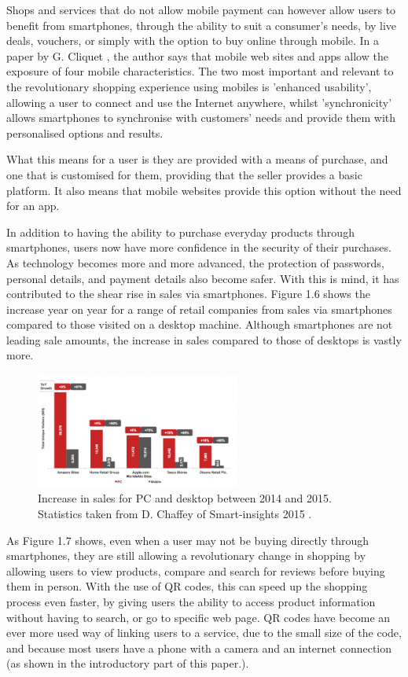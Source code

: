 Shops and services that do not allow mobile payment can however allow users to benefit from smartphones, through the ability to suit a consumer's needs, by live deals, vouchers, or simply with the option to buy online through mobile. In a paper by G. Cliquet \cite{french}, the author says that mobile web sites and apps allow the exposure of four mobile characteristics. The two most important and relevant to the revolutionary shopping experience using mobiles is 'enhanced usability', allowing a user to connect and use the Internet anywhere, whilst 'synchronicity' allows smartphones to synchronise with customers' needs and provide them with personalised options and results. \par
What this means for a user is they are provided with a means of purchase, and one that is customised for them, providing that the seller provides a basic platform. It also means that mobile websites provide this option without the need for an app. \par
In addition to having the ability to purchase everyday products through smartphones, users now have more confidence in the security of their purchases. As technology becomes more and more advanced, the protection of passwords, personal details, and payment details also become safer. With this is mind, it has contributed to the shear rise in sales via smartphones. Figure 1.6 shows the increase year on year for a range of retail companies from sales via smartphones compared to those visited on a desktop machine. Although smartphones are not leading sale amounts, the increase in sales compared to those of desktops is vastly more.
 \begin{figure}[H]
  \caption{Increase in sales for PC and desktop between 2014 and 2015. Statistics taken from D. Chaffey of Smart-insights 2015 \cite{smart-insights}.}
  \centering
  \label{fig:increase}
    \includegraphics[width=0.6\textwidth]{increase}
\end{figure}
As Figure 1.7 shows, even when a user may not be buying directly through smartphones, they are still allowing a revolutionary change in shopping by allowing users to view products, compare and search for reviews before buying them in person. With the use of QR codes, this can speed up the shopping process even faster, by giving users the ability to access product information without having to search, or go to specific web page. QR codes have become an ever more used way of linking users to a service, due to the small size of the code, and because most users have a phone with a camera and an internet connection (as shown in the introductory part of this paper.). \par
